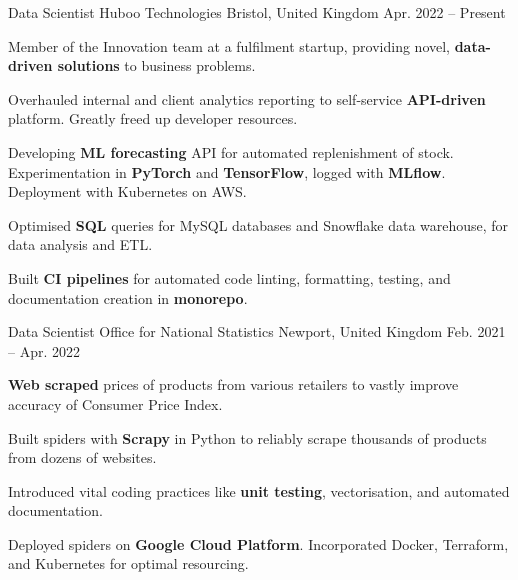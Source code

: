 
\begin{cventries}

        \cventry
        {Data Scientist} %
        {Huboo Technologies} %
        {Bristol, United Kingdom} %
        {Apr. 2022 -- Present} %
        {
            \begin{cvitems} %
                \item{Member of the Innovation team at a fulfilment startup, providing novel, \textbf{data-driven solutions} to business problems.}
                \item{Overhauled internal and client analytics reporting to self-service \textbf{API-driven} platform. Greatly freed up developer resources.}
                \item{Developing \textbf{ML forecasting} API for automated replenishment of stock. Experimentation in \textbf{PyTorch} and \textbf{TensorFlow}, logged with \textbf{MLflow}. Deployment with Kubernetes on AWS.}
                \item{Optimised \textbf{SQL} queries for MySQL databases and Snowflake data warehouse, for data analysis and ETL.}
                \item{Built \textbf{CI pipelines} for automated code linting, formatting, testing, and documentation creation in \textbf{monorepo}.}
            \end{cvitems}
        }

    \cventry
        {Data Scientist} %
        {Office for National Statistics} %
        {Newport, United Kingdom} %
        {Feb. 2021 -- Apr. 2022} %
        {
            \begin{cvitems} %
                \item{\textbf{Web scraped} prices of products from various retailers to vastly improve accuracy of Consumer Price Index.}
                \item{Built spiders with \textbf{Scrapy} in Python to reliably scrape thousands of products from dozens of websites.}
                \item{Introduced vital coding practices like \textbf{unit testing}, vectorisation, and automated documentation.}
                \item{Deployed spiders on \textbf{Google Cloud Platform}. Incorporated Docker, Terraform, and Kubernetes for optimal resourcing.}
            \end{cvitems}
        }


\end{cventries}
